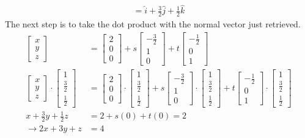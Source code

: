 \begin{solution}
\begin{align*}
= \hat{i} + \frac{3}{2}\hat{j} + \frac{1}{2}\hat{k}
\end{align*}
The next step is to take the dot product with the normal vector just retrieved.
\begin{align*}
\begin{bmatrix}
x \\
y \\
z
\end{bmatrix}
&=
\begin{bmatrix}
2 \\
0 \\
0
\end{bmatrix}
+ s
\begin{bmatrix}
-\frac{3}{2} \\
1 \\
0
\end{bmatrix}
+ t
\begin{bmatrix}
-\frac{1}{2} \\
0 \\
1
\end{bmatrix} \\
\begin{bmatrix}
x \\
y \\
z
\end{bmatrix}
\cdot
\begin{bmatrix}
1 \\
\frac{3}{2} \\
\frac{1}{2}
\end{bmatrix}
&=
\begin{bmatrix}
2 \\
0 \\
0
\end{bmatrix}
\cdot
\begin{bmatrix}
1 \\
\frac{3}{2} \\
\frac{1}{2}
\end{bmatrix}
+ s
\begin{bmatrix}
-\frac{3}{2} \\
1 \\
0
\end{bmatrix}
\cdot
\begin{bmatrix}
1 \\
\frac{3}{2} \\
\frac{1}{2}
\end{bmatrix}
+ t
\begin{bmatrix}
-\frac{1}{2} \\
0 \\
1
\end{bmatrix}
\cdot
\begin{bmatrix}
1 \\
\frac{3}{2} \\
\frac{1}{2}
\end{bmatrix} \\
x + \frac{3}{2}y + \frac{1}{2}z &= 2 + s(0) + t(0) = 2 \\
\rightarrow 2x+3y+z &= 4
\end{align*}
\end{solution}
